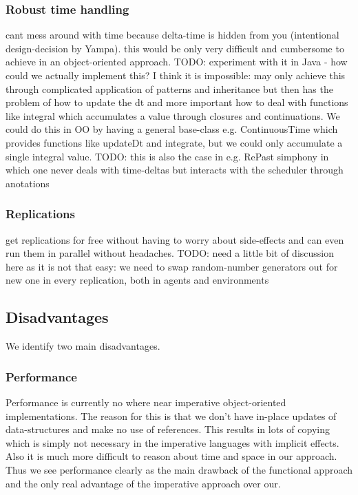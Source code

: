 \subsubsection{Robust time handling}
cant mess around with time because delta-time is hidden from you (intentional design-decision by Yampa). this would be only very difficult and cumbersome to achieve in an object-oriented approach. TODO: experiment with it in Java - how could we actually implement this? I think it is impossible: may only achieve this through complicated application of patterns and inheritance but then has the problem of how to update the dt and more important how to deal with functions like integral which accumulates a value through closures and continuations. We could do this in OO by having a general base-class e.g. ContinuousTime which provides functions like updateDt and integrate, but we could only accumulate a single integral value.
TODO: this is also the case in e.g. RePast simphony in which one never deals with time-deltas but interacts with the scheduler through anotations

\subsubsection{Replications}
get replications for free without having to worry about side-effects and can even run them in parallel without headaches. TODO: need a little bit of discussion here as it is not that easy: we need to swap random-number generators out for new one in every replication, both in agents and environments

\subsection{Disadvantages}
We identify two main disadvantages.

\subsubsection{Performance}
Performance is currently no where near imperative object-oriented implementations. The reason for this is that we don't have in-place updates of data-structures and make no use of references. This results in lots of copying which is simply not necessary in the imperative languages with implicit effects. Also it is much more difficult to reason about time and space in our approach. Thus we see performance clearly as the main drawback of the functional approach and the only real advantage of the imperative approach over our.

